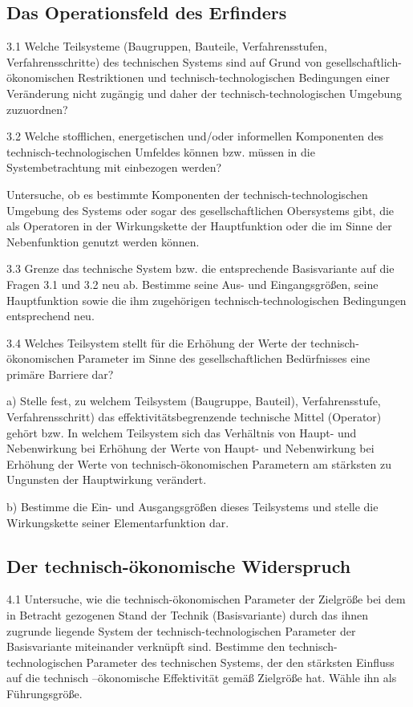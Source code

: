 \documentclass[12pt,a4paper]{article}
\begin{document}
\subsection{Das Operationsfeld des Erfinders}

3.1 Welche Teilsysteme (Baugruppen, Bauteile, Verfahrensstufen,
Verfahrensschritte) des technischen Systems sind auf Grund von
gesellschaftlich-ökonomischen Restriktionen und technisch-technologischen
Bedingungen einer Veränderung nicht zugängig und daher der
technisch-technologischen Umgebung zuzuordnen?

3.2 Welche stofflichen, energetischen und/oder informellen Komponenten des
technisch-technologischen Umfeldes können bzw. müssen in die Systembetrachtung
mit einbezogen werden?

Untersuche, ob es bestimmte Komponenten der technisch-technologischen Umgebung
des Systems oder sogar des gesellschaftlichen Obersystems gibt, die als
Operatoren in der Wirkungskette der Hauptfunktion oder die im Sinne der
Nebenfunktion genutzt werden können.

3.3 Grenze das technische System bzw. die entsprechende Basisvariante auf die
Fragen 3.1 und 3.2 neu ab. Bestimme seine Aus- und Eingangsgrößen, seine
Hauptfunktion sowie die ihm zugehörigen technisch-technologischen Bedingungen
entsprechend neu.

3.4 Welches Teilsystem stellt für die Erhöhung der Werte der
technisch-ökonomischen Parameter im Sinne des gesellschaftlichen Bedürfnisses
eine primäre Barriere dar?

a) Stelle fest, zu welchem Teilsystem (Baugruppe, Bauteil), Verfahrensstufe,
Verfahrensschritt) das effektivitätsbegrenzende technische Mittel (Operator)
gehört bzw. In welchem Teilsystem sich das Verhältnis von Haupt- und
Nebenwirkung bei Erhöhung der Werte von Haupt- und Nebenwirkung bei Erhöhung
der Werte von technisch-ökonomischen Parametern am stärksten zu Ungunsten der
Hauptwirkung verändert.

b) Bestimme die Ein- und Ausgangsgrößen dieses Teilsystems und stelle die
Wirkungskette seiner Elementarfunktion dar.

\subsection{Der technisch-ökonomische Widerspruch}

4.1 Untersuche, wie die technisch-ökonomischen Parameter der Zielgröße bei dem
in Betracht gezogenen Stand der Technik (Basisvariante) durch das ihnen
zugrunde liegende System der technisch-technologischen Parameter der
Basisvariante miteinander verknüpft sind. Bestimme den
technisch-technologischen Parameter des technischen Systems, der den stärksten
Einfluss auf die technisch –ökonomische Effektivität gemäß Zielgröße hat. Wähle
ihn als Führungsgröße.
\end{document}
